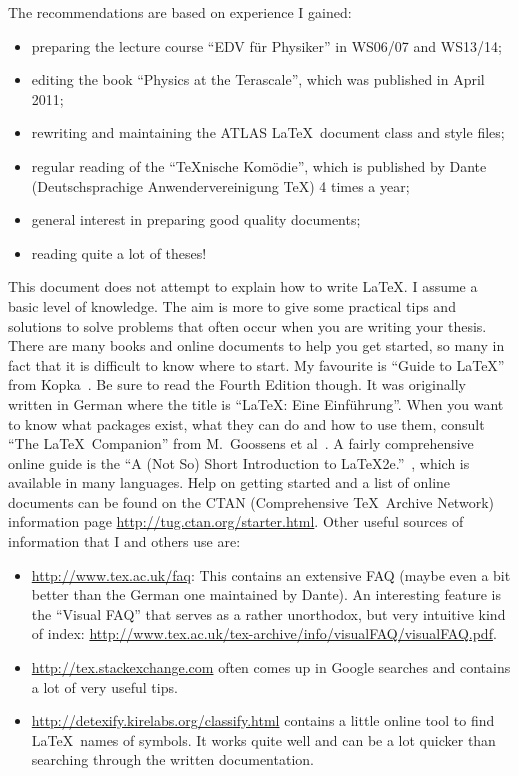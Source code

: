 The recommendations are based on experience I gained:
\begin{itemize}
\item  preparing the
lecture course \foreignquote{ngerman}{EDV für Physiker} in WS06/07 and WS13/14;
\item editing the book \enquote{Physics at the Terascale}, which was
  published in April 2011;
\item rewriting and maintaining the ATLAS \LaTeX\ document class and style files;
\item regular reading of the \foreignquote{ngerman}{TeXnische Komödie},
  which is published by \foreignlanguage{ngerman}{Dante
    (Deutschsprachige Anwendervereinigung \TeX)} 4 times a year;
\item general interest in preparing good quality documents;
\item reading quite a lot of theses!
\end{itemize}

This document does not attempt to explain how to write \LaTeX. I
assume a basic level of knowledge. The aim is more to give some
practical tips and solutions to solve problems that often occur when
you are writing your thesis. There are many books and online documents
to help you get started, so many in fact that it is difficult to know
where to start. My favourite is \enquote{Guide to \LaTeX} from
Kopka~\cite{kopka04}. Be sure to read the Fourth Edition though. It
was originally written in German where the title is
\foreignquote{ngerman}{\LaTeX: Eine Einführung}. When you want to know
what packages exist, what they can do and how to use them, consult
\enquote{The \LaTeX\ Companion} from M.~Goossens et
al~\cite{goossens04}. A fairly comprehensive online guide is the
\enquote{A (Not So) Short Introduction to LaTeX2e.}~\cite{lshort},
which is available in many languages.
Help on getting started and a list of online
documents can be found on the CTAN (Comprehensive \TeX\ Archive
Network) information page
\url{http://tug.ctan.org/starter.html}. Other useful sources of
information that I and others use are:
\begin{itemize}
\item \url{http://www.tex.ac.uk/faq}:
  This contains an extensive FAQ (maybe even a bit better than the German
  one maintained by Dante). An interesting feature is the \enquote{Visual FAQ}
  that serves as a rather unorthodox, but very intuitive kind of index:
  \url{http://www.tex.ac.uk/tex-archive/info/visualFAQ/visualFAQ.pdf}.
\item \url{http://tex.stackexchange.com} often comes up in Google
  searches and contains a lot of very useful tips.
\item \url{http://detexify.kirelabs.org/classify.html} contains a
  little online tool to find \LaTeX\ names of symbols. It works quite
  well and can be a lot quicker than searching through the written
  documentation.
\end{itemize}

